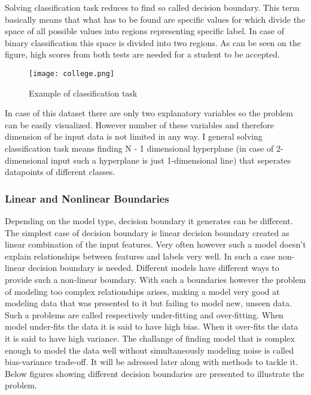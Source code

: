 \documentclass[a4paper,twoside,12pt]{book}
\begin{document}
Solving classification task reduces to find so called decision boundary. This term basically means that what has to be found are specific values for which divide the space of all possible values into regions representing specific label. In case of binary classification this space is divided into two regions.
As can be seen on the figure, high scores from both tests are needed for a student to be accepted.

\begin{figure}[h]
    \centering
    \texttt{[image: college.png]}
    \caption{Example of classification task}
    \label{fig:mesh1}
\end{figure}




In case of this dataset there are only two explanatory variables so the problem can be easily visualized. However number of these variables and therefore dimension of he input data is not limited in any way. I general solving classification task means finding N - 1 dimensional hyperplane (in case of 2-dimensional input such a hyperplane is just 1-dimensional line) that seperates datapoints of different classes.

\subsubsection{Linear and Nonlinear Boundaries}

Depending on the model type, decision boundary it generates can be different. The simplest case of decision boundary is linear decision boundary created as linear combination of the input features. Very often however such a model doesn't explain relationships between features and labels very well. In such a case non-linear decision boundary is needed. Different models have different ways to provide such a non-linear boundary. With such a boundaries however the problem of modeling too complex relationships arises, making a model very good at modeling data that was presented to it but failing to model new, unseen data.
Such a problems are called respectively under-fitting and over-fitting. When model under-fits the data it is said to have high bias. When it over-fits the data it is said to have high variance. The challange of finding model that is complex enough to model the data well without simultaneously modeling noise is called bias-variance trade-off. It will be adressed later along with methods to tackle it. Below figures showing different decision boundaries are presented to illustrate the problem. 
\end{document}
